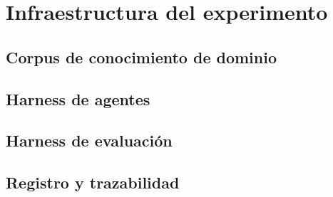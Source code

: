 \chapter{Infraestructura del experimento}\label{cap:infraestructura}


\section{Corpus de conocimiento de dominio}

\section{Harness de agentes}

\section{Harness de evaluación}

\section{Registro y trazabilidad}
